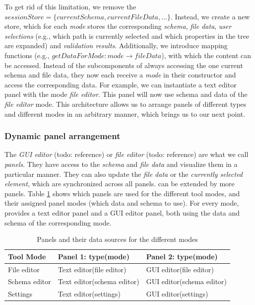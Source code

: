 To get rid of this limitation, we remove the $sessionStore = \{currentSchema, currentFileData, ...\}$.
Instead, we create a new store, which for each \textit{mode} stores the corresponding \textit{schema}, \textit{file data}, \textit{user selections} (e.g., which path is currently selected and which properties in the tree are expanded) and \textit{validation results}.
Additionally, we introduce mapping functions (e.g., $getDataForMode: mode \rightarrow {fileData}$), with which the content can be accessed.
Instead of the subcomponents of \toolname{} always accessing the one current schema and file data, they now each receive a \textit{mode} in their constructor and access the corresponding data.
For example, we can instantiate a text editor panel with the mode \textit{file editor}.
This panel will now use schema and data of the \textit{file editor} mode.
This architecture allows us to arrange panels of different types and different modes in an arbitrary manner, which brings us to our next point.



\subsubsection{Dynamic panel arrangement}\label{subsubsec:dynamic_panels}
The \textit{GUI editor} (todo: reference) or \textit{file editor} (todo: reference) are what we call \textit{panels}.
They have access to the \textit{schema} and \textit{file data} and visualize them in a particular manner.
They can also update the \textit{file data} or the \textit{currently selected element}, which are synchronized across all panels.
\toolname{} can be extended by more panels.
Table \ref{tab:panels_by_mode} shows which panels are used for the different tool modes, and their assigned panel modes (which data and schema to use).
For every mode, \toolname{} provides a text editor panel and a GUI editor panel, both using the data and schema of the corresponding mode.

\begin{table}[!t]
\caption{Panels and their data sources for the different modes}
\label{tab:panels_by_mode}
\centering\scriptsize
\begin{tabular}{@{}lll@{}}
\toprule
\textbf{Tool Mode} & \textbf{Panel 1: type(mode)} & \textbf{Panel 2: type(mode)} \\ \midrule
File editor        & Text editor(file editor)     & GUI editor(file editor)      \\
Schema editor      & Text editor(schema editor)   & GUI editor(schema editor)    \\
Settings           & Text editor(settings)        & GUI editor(settings)         \\ \bottomrule
\end{tabular}
\end{table}

